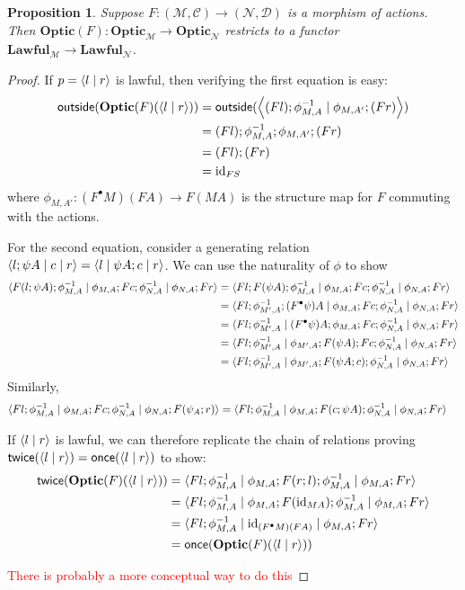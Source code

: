 \documentclass[11pt,letterpaper]{article}
\theoremstyle{plain}
\newtheorem{proposition}[theorem]{Proposition}
\theoremstyle{definition}
\newcommand{\C}{\mathscr{C}}
\newcommand{\D}{\mathscr{D}}
\newcommand{\M}{\mathscr{M}}
\newcommand{\N}{\mathscr{N}}
\newcommand{\Optic}{\mathbf{Optic}}
\newcommand{\Lawful}{\mathbf{Lawful}}
\newcommand{\id}{\mathrm{id}}
\newcommand{\rep}[2]{{\ensuremath \left\langle #1 \mid #2 \right\rangle}}
\newcommand{\repthree}[3]{{\ensuremath \langle #1 \mid #2 \mid #3 \rangle}}
\newcommand{\outside}{\mathsf{outside}}
\newcommand{\once}{\mathsf{once}}
\newcommand{\twice}{\mathsf{twice}}
\newcommand{\todo}[1]{\textcolor{red}{\small #1}}
\begin{document}
\begin{proposition}
  Suppose $F : (\M, \C) \to (\N, \D)$ is a morphism of actions. Then $\Optic(F) : \Optic_\M \to \Optic_\N$ restricts to a functor $\Lawful_\M \to \Lawful_\N$.
\end{proposition}
\begin{proof}
  If $p = \rep{l}{r}$ is lawful, then verifying the first equation is easy:
  \begin{align*}
  \outside(\Optic(F)(\rep{l}{r}))
  &= \outside(\rep{(Fl);\phi^{-1}_{M,A}}{\phi_{M,A'};(Fr)}) \\
  &= (Fl);\phi^{-1}_{M,A};\phi_{M,A'};(Fr)\\
  &= (Fl);(Fr)\\
  &= \id_{FS}
  \end{align*}
  where $\phi_{M,A'} : (F^\bullet M)(FA) \to F(MA)$ is the structure map for $F$ commuting with the actions.

  For the second equation, consider a generating relation $\repthree{l;\psi A}{c}{r} = \repthree{l}{\psi A ; c}{r}$. We can use the naturality of $\phi$ to show
  \begin{align*}
  \repthree{F(l;\psi A);\phi^{-1}_{M,A}}{\phi_{M,A};Fc;\phi^{-1}_{N,A}}{\phi_{N,A};Fr}
  &= \repthree{Fl;F(\psi A);\phi^{-1}_{M,A}}{\phi_{M,A};Fc;\phi^{-1}_{N,A}}{\phi_{N,A};Fr} \\
  &= \repthree{Fl;\phi^{-1}_{M',A};(F^\bullet \psi) A}{\phi_{M,A};Fc;\phi^{-1}_{N,A}}{\phi_{N,A};Fr} \\
  &= \repthree{Fl;\phi^{-1}_{M',A}}{(F^\bullet \psi) A;\phi_{M,A};Fc;\phi^{-1}_{N,A}}{\phi_{N,A};Fr} \\
  &= \repthree{Fl;\phi^{-1}_{M',A}}{\phi_{M',A};F(\psi A);Fc;\phi^{-1}_{N,A}}{\phi_{N,A};Fr} \\
  &= \repthree{Fl;\phi^{-1}_{M',A}}{\phi_{M',A};F(\psi A;c);\phi^{-1}_{N,A}}{\phi_{N,A};Fr}
  \end{align*}
  Similarly,
  \begin{align*}
    \repthree{Fl;\phi^{-1}_{M,A}}{\phi_{M,A};Fc;\phi^{-1}_{N,A}}{\phi_{N,A};F(\psi_A;r)}
    &= \repthree{Fl;\phi^{-1}_{M,A}}{\phi_{M,A};F(c;\psi A);\phi^{-1}_{N,A}}{\phi_{N,A};Fr}
  \end{align*}

  If $\rep{l}{r}$ is lawful, we can therefore replicate the chain of relations proving $\twice(\rep{l}{r}) = \once(\rep{l}{r})$ to show:
  \begin{align*}
  \twice(\Optic(F)(\rep{l}{r}))
  &= \repthree{Fl;\phi^{-1}_{M,A}}{\phi_{M,A};F(r;l);\phi^{-1}_{M,A}}{\phi_{M,A};Fr}  \\
  &= \repthree{Fl;\phi^{-1}_{M,A}}{\phi_{M,A};F(\id_{MA});\phi^{-1}_{M,A}}{\phi_{M,A};Fr}  \\
  &= \repthree{Fl;\phi^{-1}_{M,A}}{\id_{(F^\bullet M)(FA)}}{\phi_{M,A};Fr}  \\
  &= \once(\Optic(F)(\rep{l}{r}))
  \end{align*}

  \todo{There is probably a more conceptual way to do this}
\end{proof}
\end{document}
